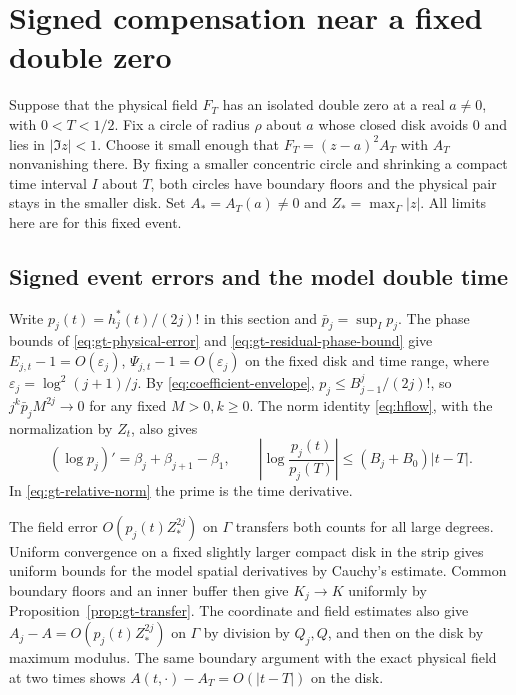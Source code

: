 \section{Signed compensation near a fixed double zero}
\label{sec:gt-critical-scale}

Suppose that the physical field \(F_T\) has an isolated double zero
at a real \(a\ne0\), with \(0<T<1/2\). Fix a circle of radius \(\rho\)
about \(a\) whose closed disk avoids \(0\) and lies in \(|\Im z|<1\).
Choose it small enough that \(F_T=(z-a)^2 A_T\) with \(A_T\)
nonvanishing there. By fixing a smaller concentric circle and
shrinking a compact time interval \(I\) about \(T\), both circles
have boundary floors and the physical pair stays in the smaller
disk. Set \(A_*=A_T(a)\ne0\) and \(Z_*=\max_\Gamma|z|\).
All limits here are for this fixed event.

\subsection{Signed event errors and the model double time}

Write \(p_j(t)=h_j^*(t)/(2j)!\) in this section and
\(\bar p_j=\sup_I p_j\). The phase bounds of
\eqref{eq:gt-physical-error} and \eqref{eq:gt-residual-phase-bound}
give \(E_{j,t}-1=O(\varepsilon_j)\),
\(\Psi_{j,t}-1=O(\varepsilon_j)\) on the fixed disk and time range,
where \(\varepsilon_j=\log^2(j+1)/j\). By
\eqref{eq:coefficient-envelope}, \(p_j\le B_{j-1}^j/(2j)!\),
so \(j^k\bar p_j M^{2j}\to0\) for any fixed \(M>0,k\ge0\).
The norm identity \eqref{eq:hflow}, with the normalization by \(Z_t\),
also gives
\begin{equation}
 (\log p_j)'=\beta_j+\beta_{j+1}-\beta_1,\qquad
 \left|\log\frac{p_j(t)}{p_j(T)}\right|
 \le (B_j+B_0)|t-T|.
 \label{eq:gt-relative-norm}
\end{equation}
In \eqref{eq:gt-relative-norm} the prime is the time derivative.

The field error \(O(p_j(t)Z_*^{2j})\) on \(\Gamma\) transfers
both counts for all large degrees. Uniform convergence on a fixed
slightly larger compact disk in the strip gives uniform bounds for
the model spatial derivatives by Cauchy's estimate. Common boundary
floors and an inner buffer then give \(K_j\to K\) uniformly by
Proposition~\ref{prop:gt-transfer}. The coordinate and field
estimates also give \(A_j-A=O(p_j(t)Z_*^{2j})\) on \(\Gamma\) by
division by \(Q_j,Q\), and then on the disk by maximum modulus.
The same boundary argument with the exact physical field at two
times shows \(A(t,\cdot)-A_T=O(|t-T|)\) on the disk.

